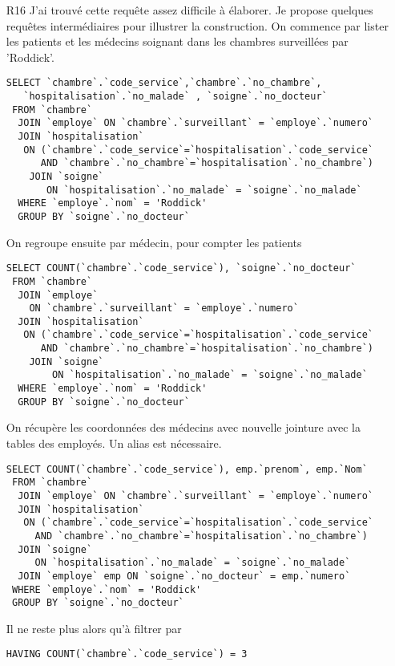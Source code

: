 \begin{enumerate}
  \item[R16] J'ai trouvé cette requête assez difficile à élaborer. Je propose quelques requêtes intermédiaires pour illustrer la construction.
On commence par lister les patients et les médecins soignant dans les chambres surveillées par 'Roddick'.
\begin{verbatim}
SELECT `chambre`.`code_service`,`chambre`.`no_chambre`,
   `hospitalisation`.`no_malade` , `soigne`.`no_docteur`
 FROM `chambre`
  JOIN `employe` ON `chambre`.`surveillant` = `employe`.`numero`
  JOIN `hospitalisation` 
   ON (`chambre`.`code_service`=`hospitalisation`.`code_service` 
      AND `chambre`.`no_chambre`=`hospitalisation`.`no_chambre`)
    JOIN `soigne` 
       ON `hospitalisation`.`no_malade` = `soigne`.`no_malade`
  WHERE `employe`.`nom` = 'Roddick'
  GROUP BY `soigne`.`no_docteur`
\end{verbatim}
On regroupe ensuite par médecin, pour compter les patients
\begin{verbatim}
SELECT COUNT(`chambre`.`code_service`), `soigne`.`no_docteur`
 FROM `chambre`
  JOIN `employe` 
    ON `chambre`.`surveillant` = `employe`.`numero`
  JOIN `hospitalisation` 
   ON (`chambre`.`code_service`=`hospitalisation`.`code_service` 
      AND `chambre`.`no_chambre`=`hospitalisation`.`no_chambre`)
    JOIN `soigne` 
        ON `hospitalisation`.`no_malade` = `soigne`.`no_malade`
  WHERE `employe`.`nom` = 'Roddick'
  GROUP BY `soigne`.`no_docteur`
\end{verbatim}
On récupère les coordonnées des médecins avec nouvelle jointure avec la tables des employés. Un alias est nécessaire.
\begin{verbatim}
SELECT COUNT(`chambre`.`code_service`), emp.`prenom`, emp.`Nom`
 FROM `chambre`
  JOIN `employe` ON `chambre`.`surveillant` = `employe`.`numero`
  JOIN `hospitalisation` 
   ON (`chambre`.`code_service`=`hospitalisation`.`code_service` 
     AND `chambre`.`no_chambre`=`hospitalisation`.`no_chambre`)
  JOIN `soigne` 
     ON `hospitalisation`.`no_malade` = `soigne`.`no_malade`
  JOIN `employe` emp ON `soigne`.`no_docteur` = emp.`numero`
 WHERE `employe`.`nom` = 'Roddick'
 GROUP BY `soigne`.`no_docteur`
\end{verbatim}
Il ne reste plus alors qu'à filtrer par
\begin{verbatim}
HAVING COUNT(`chambre`.`code_service`) = 3
\end{verbatim}

\end{enumerate}
